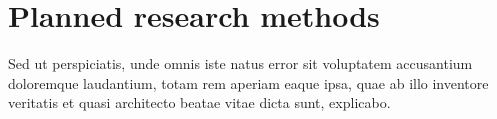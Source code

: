 \section{Planned research methods}


Sed ut perspiciatis, unde omnis iste natus error sit voluptatem accusantium doloremque laudantium, totam rem aperiam eaque ipsa, quae ab illo inventore veritatis et quasi architecto beatae vitae dicta sunt, explicabo.
